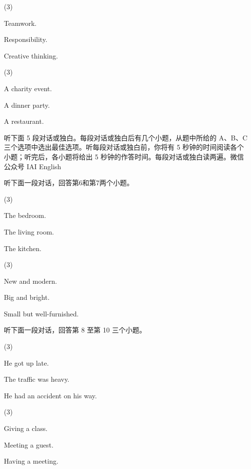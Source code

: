 \documentclass{英语试卷}
\begin{document}
\begin{choices}(3)
  \item Teamwork.
  \item Responsibility.
  \item Creative thinking.
\end{choices}
\begin{choices}(3)
  \item A charity event.
  \item A dinner party.
  \item A restaurant.
\end{choices}
\par 听下面 5 段对话或独白。每段对话或独白后有几个小题，从题中所给的 A、B、C 三个选项中选出最佳选项。听每段对话或独白前，你将有 5 秒钟的时间阅读各个小题；听完后，各小题将给出 5 秒钟的作答时间。每段对话或独白读两遍。微信公众号 IAI English\par
\par 听下面一段对话，回答第6和第7两个小题。\par
{}
\begin{choices}(3)
  \item The bedroom.
  \item The living room.
  \item The kitchen.
\end{choices}
\begin{choices}(3)
  \item New and modern.
  \item Big and bright.
  \item Small but well-furnished.
\end{choices}
\par 听下面一段对话，回答第 8 至第 10 三个小题。\par
{}
\begin{choices}(3)
  \item He got up late.
  \item The traffic was heavy.
  \item He had an accident on his way.
\end{choices}
\begin{choices}(3)
  \item Giving a class.
  \item Meeting a guest.
  \item Having a meeting.
\end{choices}
\end{document}
